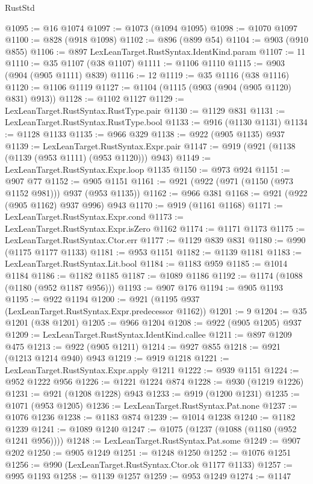 \begin{lexlean}{RustStd}
\begin{coremodule}
@1095 := @16 @1074
@1097 := @1073 (@1094 @1095)
@1098 := @1070 @1097
@1100 := @828 (@918 @1098)
@1102 := @896 (@899 @54)
@1104 := @903 (@910 @855)
@1106 := @897 LexLeanTarget.RustSyntax.IdentKind.param
@1107 := 11
@1110 := @35 @1107 (@38 @1107)
@1111 := @1106 @1110
@1115 := @903 (@904 (@905 @1111) @839)
@1116 := 12
@1119 := @35 @1116 (@38 @1116)
@1120 := @1106 @1119
@1127 := @1104 (@1115 (@903 (@904 (@905 @1120) @831) @913))
@1128 := @1102 @1127
@1129 := LexLeanTarget.RustSyntax.RustType.pair
@1130 := @1129 @831
@1131 := LexLeanTarget.RustSyntax.RustType.bool
@1133 := @916 (@1130 @1131)
@1134 := @1128 @1133
@1135 := @966 @329
@1138 := @922 (@905 @1135) @937
@1139 := LexLeanTarget.RustSyntax.Expr.pair
@1147 := @919 (@921 (@1138 (@1139 (@953 @1111) (@953 @1120))) @943)
@1149 := LexLeanTarget.RustSyntax.Expr.loop @1135
@1150 := @973 @924
@1151 := @907 @77
@1152 := @905 @1151
@1161 := @921 (@922 (@971 (@1150 (@973 @1152 @981))) @937 (@953 @1135))
@1162 := @966 @381
@1168 := @921 (@922 (@905 @1162) @937 @996) @943
@1170 := @919 (@1161 @1168)
@1171 := LexLeanTarget.RustSyntax.Expr.cond
@1173 := LexLeanTarget.RustSyntax.Expr.isZero @1162
@1174 := @1171 @1173
@1175 := LexLeanTarget.RustSyntax.Ctor.err
@1177 := @1129 @839 @831
@1180 := @990 (@1175 @1177 @1133)
@1181 := @953 @1151
@1182 := @1139 @1181
@1183 := LexLeanTarget.RustSyntax.Lit.bool
@1184 := @1183 @959
@1185 := @1014 @1184
@1186 := @1182 @1185
@1187 := @1089 @1186
@1192 := @1174 (@1088 (@1180 (@952 @1187 @956)))
@1193 := @907 @176
@1194 := @905 @1193
@1195 := @922 @1194
@1200 := @921 (@1195 @937 (LexLeanTarget.RustSyntax.Expr.predecessor @1162))
@1201 := 9
@1204 := @35 @1201 (@38 @1201)
@1205 := @966 @1204
@1208 := @922 (@905 @1205) @937
@1209 := LexLeanTarget.RustSyntax.IdentKind.callee
@1211 := @897 @1209 @475
@1213 := @922 (@905 @1211)
@1214 := @927 @855
@1218 := @921 (@1213 @1214 @940) @943
@1219 := @919 @1218
@1221 := LexLeanTarget.RustSyntax.Expr.apply @1211
@1222 := @939 @1151
@1224 := @952 @1222 @956
@1226 := @1221 @1224 @874
@1228 := @930 (@1219 @1226)
@1231 := @921 (@1208 @1228) @943
@1233 := @919 (@1200 @1231)
@1235 := @1071 (@953 @1205)
@1236 := LexLeanTarget.RustSyntax.Pat.none
@1237 := @1076 @1236
@1238 := @1183 @874
@1239 := @1014 @1238
@1240 := @1182 @1239
@1241 := @1089 @1240
@1247 := @1075 (@1237 (@1088 (@1180 (@952 @1241 @956))))
@1248 := LexLeanTarget.RustSyntax.Pat.some
@1249 := @907 @202
@1250 := @905 @1249
@1251 := @1248 @1250
@1252 := @1076 @1251
@1256 := @990 (LexLeanTarget.RustSyntax.Ctor.ok @1177 @1133)
@1257 := @995 @1193
@1258 := @1139 @1257
@1259 := @953 @1249
@1274 := @1147

\end{coremodule}
\end{lexlean}
